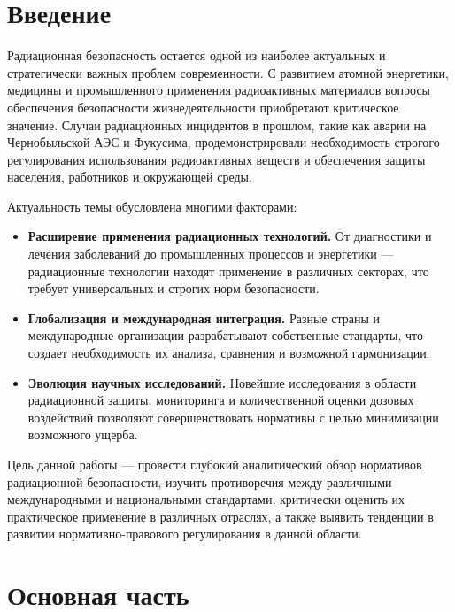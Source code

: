 \documentclass[a4paper, 14pt]{extarticle}
\begin{document}

\tableofcontents

\newpage

\section{Введение}

Радиационная безопасность остается одной из наиболее актуальных и стратегически важных проблем современности. С развитием атомной энергетики, медицины и промышленного применения радиоактивных материалов вопросы обеспечения безопасности жизнедеятельности приобретают критическое значение. Случаи радиационных инцидентов в прошлом, такие как аварии на Чернобыльской АЭС и Фукусима, продемонстрировали необходимость строгого регулирования использования радиоактивных веществ и обеспечения защиты населения, работников и окружающей среды.

Актуальность темы обусловлена многими факторами:

\begin{itemize}
    \item \textbf{Расширение применения радиационных технологий.} От диагностики и лечения заболеваний до промышленных процессов и энергетики — радиационные технологии находят применение в различных секторах, что требует универсальных и строгих норм безопасности.

    \item \textbf{Глобализация и международная интеграция.} Разные страны и международные организации разрабатывают собственные стандарты, что создает необходимость их анализа, сравнения и возможной гармонизации.

    \item \textbf{Эволюция научных исследований.} Новейшие исследования в области радиационной защиты, мониторинга и количественной оценки дозовых воздействий позволяют совершенствовать нормативы с целью минимизации возможного ущерба.
\end{itemize}

Цель данной работы — провести глубокий аналитический обзор нормативов радиационной безопасности, изучить противоречия между различными международными и национальными стандартами, критически оценить их практическое применение в различных отраслях, а также выявить тенденции в развитии нормативно-правового регулирования в данной области.

\section{Основная часть}
\end{document}
